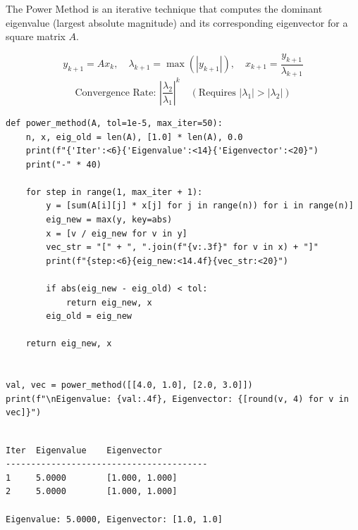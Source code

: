\documentclass[10pt,a4paper]{report}
\begin{document}
The Power Method is an iterative technique that computes the dominant eigenvalue (largest absolute magnitude) and its corresponding eigenvector for a square matrix $A$.

\begin{tcolorbox}[colback=theorybg,colframe=theoryframe,title=\textbf{Mathematical Theory \& Formulation},boxrule=1pt,arc=2mm]
\[
y_{k+1} = A x_k, \quad \lambda_{k+1} = \max(|y_{k+1}|), \quad x_{k+1} = \frac{y_{k+1}}{\lambda_{k+1}}
\]
\[
\text{Convergence Rate: } \left|\frac{\lambda_2}{\lambda_1}\right|^k \quad (\text{Requires } |\lambda_1| > |\lambda_2|)
\]
\end{tcolorbox}

\begin{tcolorbox}[colback=codebg,colframe=secondary,title=\textbf{Python Implementation (Step-by-Step Functions)},boxrule=1pt,arc=2mm]
\begin{lstlisting}[style=python_detailed]
def power_method(A, tol=1e-5, max_iter=50):
    n, x, eig_old = len(A), [1.0] * len(A), 0.0
    print(f"{'Iter':<6}{'Eigenvalue':<14}{'Eigenvector':<20}")
    print("-" * 40)

    for step in range(1, max_iter + 1):
        y = [sum(A[i][j] * x[j] for j in range(n)) for i in range(n)]
        eig_new = max(y, key=abs)
        x = [v / eig_new for v in y]
        vec_str = "[" + ", ".join(f"{v:.3f}" for v in x) + "]"
        print(f"{step:<6}{eig_new:<14.4f}{vec_str:<20}")

        if abs(eig_new - eig_old) < tol:
            return eig_new, x
        eig_old = eig_new

    return eig_new, x


val, vec = power_method([[4.0, 1.0], [2.0, 3.0]])
print(f"\nEigenvalue: {val:.4f}, Eigenvector: {[round(v, 4) for v in vec]}")


\end{lstlisting}
\end{tcolorbox}

\begin{tcolorbox}[colback=termbg,colframe=primary,title=\textbf{Program Execution Output \& Convergence Table},boxrule=1pt,arc=2mm]
\begin{lstlisting}[style=terminal_output]
Iter  Eigenvalue    Eigenvector         
----------------------------------------
1     5.0000        [1.000, 1.000]      
2     5.0000        [1.000, 1.000]      

Eigenvalue: 5.0000, Eigenvector: [1.0, 1.0]
\end{lstlisting}
\end{tcolorbox}
\end{document}
